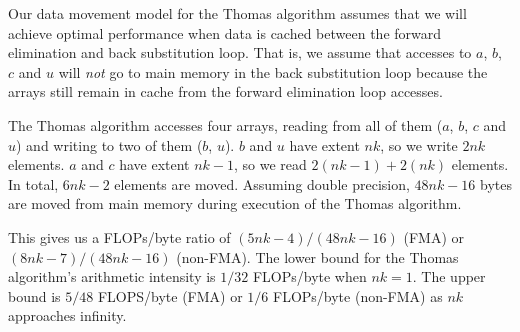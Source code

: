 \documentclass{sig-alternate-05-2015}
\begin{document}
Our data movement model for the Thomas algorithm assumes that we will achieve
  optimal performance when data is cached between the forward elimination and
  back substitution loop.
That is, we assume that accesses to \(a\), \(b\), \(c\) and \(u\) will
  \emph{not} go to main memory in the back substitution loop because the arrays
  still remain in cache from the forward elimination loop accesses.

The Thomas algorithm accesses four arrays, reading from all of them (\(a\),
  \(b\), \(c\) and \(u\)) and writing to two of them (\(b\), \(u\)).
\(b\) and \(u\) have extent \(nk\), so we write \(2nk\) elements.
\(a\) and \(c\) have extent \(nk-1\), so we read \(2(nk-1)+2(nk)\) elements.
In total, \(6nk-2\) elements are moved.
Assuming double precision, \(48nk-16\) bytes are moved from main memory
  during execution of the Thomas algorithm.

This gives us a FLOPs/byte ratio of \((5nk-4)/(48nk-16)\) (FMA) or
  \((8nk-7)/(48nk-16)\) (non-FMA).
The lower bound for the Thomas algorithm's arithmetic intensity is \(1/32\)
  FLOPs/byte when \(nk=1\). 
The upper bound is \(5/48\) FLOPS/byte (FMA) or \(1/6\) FLOPs/byte (non-FMA) as
  \(nk\) approaches infinity.
\end{document}
